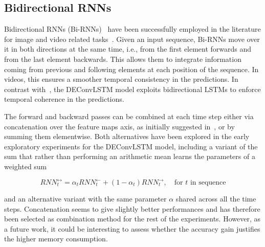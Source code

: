 \subsection{Bidirectional RNNs}\label{deconvLSTM_biRNN}
Bidirectional RNNs (Bi-RNNs)~\cite{Schuster1997bidirecrnn} have been
successfully employed in the literature for image and video related
tasks~\cite{Graves+Schmidhuber-2009,visin2015renet,Du2015_CVPR,
Visin_2016_CVPR_Workshops}. Given an input sequence, Bi-RNNs move over it in
both directions at the same time, i.e., from the first element forwards and
from the last element backwards. This allows them to integrate information
coming from previous and following elements at each position of the sequence.
In videos, this ensures a smoother temporal consistency in the predictions. In
contrast with~\cite{ShiCWYWW15}, the DEConvLSTM model exploits bidirectional
LSTMs to enforce temporal coherence in the predictions.

The forward and backward passes can be combined at each time step either via
concatenation over the feature maps axis, as initially suggested in~\cite{
Schuster1997bidirecrnn}, or by summing them elementwise. Both alternatives have
been explored in the early exploratory experiments for the DEConvLSTM model,
including a variant of the sum that rather than performing an arithmetic mean
learns the parameters of a weighted sum

\begin{equation}
    RNN_t^{\leftrightarrow} = \alpha_t RNN_t^{\leftarrow} +
        (1 - \alpha_t) RNN_t^{\rightarrow}, \quad\text{for $t$ in sequence}
\end{equation}

\noindent and an alternative variant with the same parameter $\alpha$ shared
across all the time steps. Concatenation seems to give slightly better
performances and has therefore been selected as combination method for the
rest of the experiments. However, as a future work, it could be interesting to
assess whether the accuracy gain justifies the higher memory consumption.


